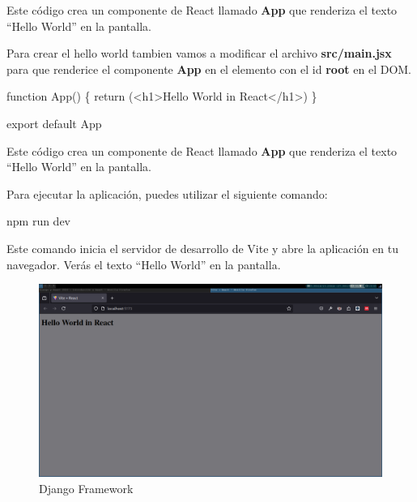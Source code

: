 \documentclass[
  a4paper,
  DIV=11,
  numbers=noendperiod,
  onepage,
  openany]{scrreprt}
\newenvironment{Shaded}{\begin{snugshade}}{\end{snugshade}}
\newcommand{\ControlFlowTok}[1]{\textcolor[rgb]{0.00,0.23,0.31}{#1}}
\newcommand{\ExtensionTok}[1]{\textcolor[rgb]{0.00,0.23,0.31}{#1}}
\newcommand{\FunctionTok}[1]{\textcolor[rgb]{0.28,0.35,0.67}{#1}}
\newcommand{\ImportTok}[1]{\textcolor[rgb]{0.00,0.46,0.62}{#1}}
\newcommand{\KeywordTok}[1]{\textcolor[rgb]{0.00,0.23,0.31}{#1}}
\newcommand{\NormalTok}[1]{\textcolor[rgb]{0.00,0.23,0.31}{#1}}
\begin{document}
Este código crea un componente de React llamado \textbf{App} que
renderiza el texto ``Hello World'' en la pantalla.

Para crear el hello world tambien vamos a modificar el archivo
\textbf{src/main.jsx} para que renderice el componente \textbf{App} en
el elemento con el id \textbf{root} en el DOM.

\begin{Shaded}
\begin{Highlighting}[]
\KeywordTok{function} \FunctionTok{App}\NormalTok{() \{}
  \ControlFlowTok{return}\NormalTok{ (}\KeywordTok{\textless{}h1\textgreater{}}\NormalTok{Hello World in React}\KeywordTok{\textless{}/h1\textgreater{}}\NormalTok{)}
\NormalTok{\}}

\ImportTok{export} \ImportTok{default}\NormalTok{ App}
\end{Highlighting}
\end{Shaded}

Este código crea un componente de React llamado \textbf{App} que
renderiza el texto ``Hello World'' en la pantalla.

Para ejecutar la aplicación, puedes utilizar el siguiente comando:

\begin{Shaded}
\begin{Highlighting}[]
\ExtensionTok{npm}\NormalTok{ run dev}
\end{Highlighting}
\end{Shaded}

Este comando inicia el servidor de desarrollo de Vite y abre la
aplicación en tu navegador. Verás el texto ``Hello World'' en la
pantalla.

\begin{figure}[H]

{\centering \includegraphics{images/react_hello_world.png}

}

\caption{Django Framework}

\end{figure}%
\end{document}
